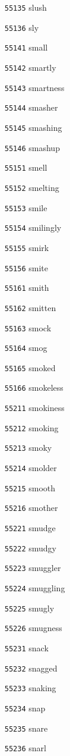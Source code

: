 \documentclass[twoside,11pt]{article}
\begin{document}
\begin{multicols}{5}
\begin{enumerate}
\item[\texttt{55135}] slush
\item[\texttt{55136}] sly
\item[\texttt{55141}] small
\item[\texttt{55142}] smartly
\item[\texttt{55143}] smartness
\item[\texttt{55144}] smasher
\item[\texttt{55145}] smashing
\item[\texttt{55146}] smashup
\item[\texttt{55151}] smell
\item[\texttt{55152}] smelting
\item[\texttt{55153}] smile
\item[\texttt{55154}] smilingly
\item[\texttt{55155}] smirk
\item[\texttt{55156}] smite
\item[\texttt{55161}] smith
\item[\texttt{55162}] smitten
\item[\texttt{55163}] smock
\item[\texttt{55164}] smog
\item[\texttt{55165}] smoked
\item[\texttt{55166}] smokeless
\item[\texttt{55211}] smokiness
\item[\texttt{55212}] smoking
\item[\texttt{55213}] smoky
\item[\texttt{55214}] smolder
\item[\texttt{55215}] smooth
\item[\texttt{55216}] smother
\item[\texttt{55221}] smudge
\item[\texttt{55222}] smudgy
\item[\texttt{55223}] smuggler
\item[\texttt{55224}] smuggling
\item[\texttt{55225}] smugly
\item[\texttt{55226}] smugness
\item[\texttt{55231}] snack
\item[\texttt{55232}] snagged
\item[\texttt{55233}] snaking
\item[\texttt{55234}] snap
\item[\texttt{55235}] snare
\item[\texttt{55236}] snarl

\end{enumerate}
\end{multicols}
\end{document}
